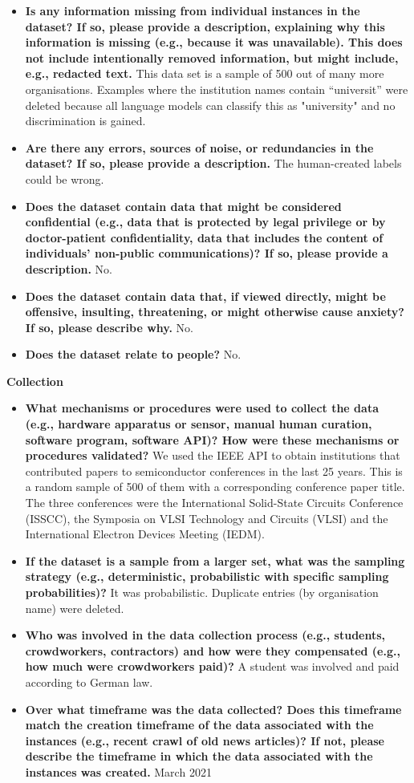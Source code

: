 \documentclass{article}
\begin{document}
\begin{itemize}
    \item \textbf{Is any information missing from individual instances in the dataset? If so, please provide a description, explaining why this information is missing (e.g., because it was unavailable). This does not include intentionally removed information, but might include, e.g., redacted text.} This data set is a sample of 500 out of many more organisations. Examples where the institution names contain “universit” were deleted because all language models can classify this as "university" and no discrimination is gained.
    \item \textbf{Are there any errors, sources of noise, or redundancies in the dataset? If so, please provide a description.} The human-created labels could be wrong.
    \item \textbf{Does the dataset contain data that might be considered confidential (e.g., data that is protected by legal privilege or by doctor-patient confidentiality, data that includes the content of individuals’ non-public communications)? If so, please provide a description.} No.
    \item \textbf{Does the dataset contain data that, if viewed directly, might be offensive, insulting, threatening, or might otherwise cause anxiety? If so, please describe why.} No.
    \item \textbf{Does the dataset relate to people?} No.
\end{itemize}

\textbf{Collection}

\begin{itemize}
    \item \textbf{What mechanisms or procedures were used to collect the data (e.g., hardware apparatus or sensor, manual human curation, software program, software API)? How were these mechanisms or procedures validated?} We used the IEEE API to obtain institutions that contributed papers to semiconductor conferences in the last 25 years. This is a random sample of 500 of them with a corresponding conference paper title. The three conferences were the International Solid-State Circuits Conference (ISSCC), the Symposia on VLSI Technology and Circuits (VLSI) and the International Electron Devices Meeting (IEDM).
    \item \textbf{If the dataset is a sample from a larger set, what was the sampling strategy (e.g., deterministic, probabilistic with specific sampling probabilities)?} It was probabilistic. Duplicate entries (by organisation name) were deleted.
    \item \textbf{Who was involved in the data collection process (e.g., students, crowdworkers, contractors) and how were they compensated (e.g., how much were crowdworkers paid)?} A student was involved and paid according to German law.
    \item \textbf{Over what timeframe was the data collected? Does this timeframe match the creation timeframe of the data associated with the instances (e.g., recent crawl of old news articles)? If not, please describe the timeframe in which the data associated with the instances was created.} March 2021
\end{itemize}
\end{document}
